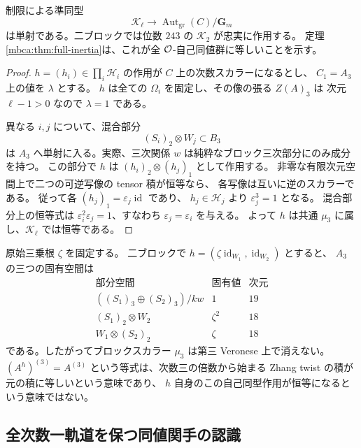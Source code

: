 \begin{proposition}
\label{mbva:prop:faithful}
制限による準同型
\[
 \mathcal K_\ell\longrightarrow
 \operatorname{Aut}_{\mathrm{gr}}(C)/\mathbf G_m
\]
は単射である。二ブロックでは位数 $243$ の $\mathcal K_2$ が忠実に作用する。
定理\ref{mbca:thm:full-inertia}は、これが全 $\mathcal O$-自己同値群に等しいことを示す。
\end{proposition}
\begin{proof}
$h=(h_i)\in\prod_i\mathcal H_i$ の作用が $C$ 上の次数スカラーになるとし、
$C_1=A_3$ 上の値を $\lambda$ とする。
$h$ は全ての $\Omega_i$ を固定し、その像の張る $Z(A)_3$ は
次元 $\ell-1>0$ なので $\lambda=1$ である。

異なる $i,j$ について、混合部分
\[
 (S_i)_2\otimes W_j\subset B_3
\]
は $A_3$ へ単射に入る。実際、三次関係 $w$ は純粋なブロック三次部分にのみ成分を持つ。
この部分で $h$ は $(h_i)_2\otimes(h_j)_1$ として作用する。
非零な有限次元空間上で二つの可逆写像の tensor 積が恒等なら、
各写像は互いに逆のスカラーである。
従って各 $(h_j)_1=\varepsilon_j\operatorname{id}$ であり、
$h_j\in\mathcal H_j$ より $\varepsilon_j^3=1$ となる。
混合部分上の恒等式は
$\varepsilon_i^2\varepsilon_j=1$、すなわち $\varepsilon_j=\varepsilon_i$ を与える。
よって $h$ は共通 $\mu_3$ に属し、$\mathcal K_\ell$ では恒等である。
\end{proof}

\begin{remark}
\label{mbva:rem:scalar-action}
原始三乗根 $\zeta$ を固定する。
二ブロックで $h=(\zeta\operatorname{id}_{W_1},\operatorname{id}_{W_2})$ とすると、
$A_3$ の三つの固有空間は
\[
 \begin{array}{c|c|c}
 \text{部分空間}&\text{固有値}&\text{次元}\\ \hline
 ((S_1)_3\oplus(S_2)_3)/kw&1&19\\
 (S_1)_2\otimes W_2&\zeta^2&18\\
 W_1\otimes(S_2)_2&\zeta&18
 \end{array}
\]
である。したがってブロックスカラー $\mu_3$ は第三 Veronese 上で消えない。
$(A^h)^{(3)}=A^{(3)}$ という等式は、次数三の倍数から始まる
Zhang twist の積が元の積に等しいという意味であり、
$h$ 自身のこの自己同型作用が恒等になるという意味ではない。
\end{remark}

\subsection{全次数一軌道を保つ同値関手の認識}

